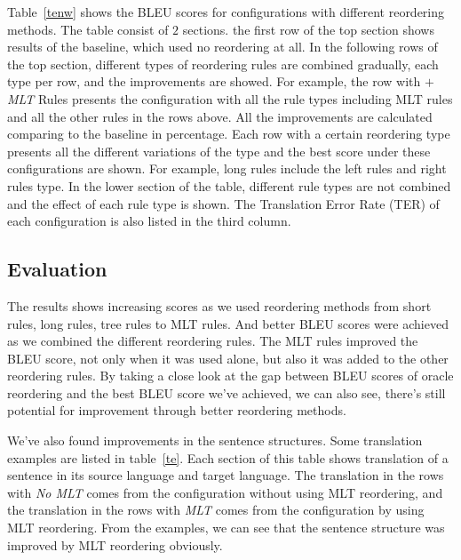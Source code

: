 Table~\ref{tenw} shows the BLEU scores for configurations with different reordering methods. The table consist of $2$ sections. the first row of the top section shows results of the baseline, which used no reordering at all. In the following rows of the top section, different types of reordering rules are combined gradually, each type per row, and the improvements are showed. For example, the row with \emph{$+$MLT} Rules presents the configuration with all the rule types including MLT rules and all the other rules in the rows above. All the improvements are calculated comparing to the baseline in percentage. Each row with a certain reordering type presents all the different variations of the type and the best score under these configurations are shown. For example, long rules include the left rules and right rules type. In the lower section of the table, different rule types are not combined and the effect of each rule type is shown. The Translation Error Rate (TER) of each configuration is also listed in the third column. %

\subsection{Evaluation}

The results shows increasing scores as we used reordering methods from short rules, long rules, tree rules to MLT rules. And better BLEU scores were achieved as we combined the different reordering rules. The MLT rules improved the BLEU score, not only when it was used alone, but also it was added to the other reordering rules. 
By taking a close look at the gap between BLEU scores of oracle reordering and the best BLEU score we've achieved, we can also see, there's still potential for improvement through better reordering methods.

We've also found improvements in the sentence structures. Some translation examples are listed in table~\ref{te}. Each section of this table shows translation of a sentence in its source language and target language. The translation in the rows with \emph{No MLT} comes from the configuration without using MLT reordering, and the translation in the rows with \emph{MLT} comes from the configuration by using MLT reordering. From the examples, we can see that the sentence structure was improved by MLT reordering obviously.

